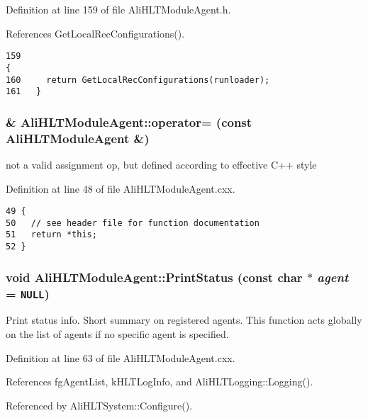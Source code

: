 Definition at line 159 of file Ali\-HLTModule\-Agent.h.

References Get\-Local\-Rec\-Configurations().

\footnotesize\begin{verbatim}159                                                                        {
160     return GetLocalRecConfigurations(runloader);
161   }
\end{verbatim}\normalsize 


\subsubsection{ \& Ali\-HLTModule\-Agent::operator= (const {\bf Ali\-HLTModule\-Agent} \&)}\label{classAliHLTModuleAgent_a2}


not a valid assignment op, but defined according to effective C++ style 

Definition at line 48 of file Ali\-HLTModule\-Agent.cxx.

\footnotesize\begin{verbatim}49 {
50   // see header file for function documentation
51   return *this;
52 }
\end{verbatim}\normalsize 


\subsubsection{\setlength{\rightskip}{0pt plus 5cm}void Ali\-HLTModule\-Agent::Print\-Status (const char $\ast$ {\em agent} = {\tt NULL})\hspace{0.3cm}{\tt  [static]}}\label{classAliHLTModuleAgent_e0}


Print status info. Short summary on registered agents. This function acts globally on the list of agents if no specific agent is specified. 

Definition at line 63 of file Ali\-HLTModule\-Agent.cxx.

References fg\-Agent\-List, k\-HLTLog\-Info, and Ali\-HLTLogging::Logging().

Referenced by Ali\-HLTSystem::Configure().

